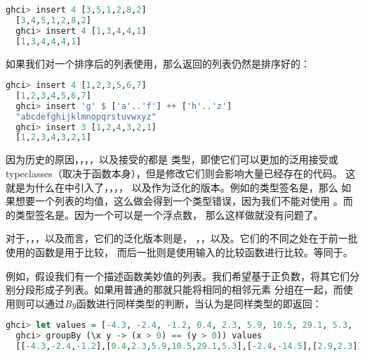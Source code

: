 \documentclass[./main.tex]{subfiles}
\begin{document}
\begin{lstlisting}[language=Haskell]
  ghci> insert 4 [3,5,1,2,8,2]
  [3,4,5,1,2,8,2]
  ghci> insert 4 [1,3,4,4,1]
  [1,3,4,4,4,1]
\end{lstlisting}

如果我们对一个排序后的列表使用，那么返回的列表仍然是排序好的：

\begin{lstlisting}[language=Haskell]
  ghci> insert 4 [1,2,3,5,6,7]
  [1,2,3,4,5,6,7]
  ghci> insert 'g' $ ['a'..'f'] ++ ['h'..'z']
  "abcdefghijklmnopqrstuvwxyz"
  ghci> insert 3 [1,2,4,3,2,1]
  [1,2,3,4,3,2,1]
\end{lstlisting}

因为历史的原因，，，，\acode{!!}以及接受的都是
类型，即使它们可以更加的泛用接受或 typeclasses（取决于函数本身），但是修改它们则会影响大量已经存在的代码。
这就是为什么在中引入了，，，，
以及作为泛化的版本。例如的类型签名是，那么
如果想要一个列表的均值，这么做会得到一个类型错误，因为我们不能对使用
\acode{/}。而的类型签名是。因为一个可以是一个浮点数，
那么这样做就没有问题了。

对于，，，以及而言，它们的泛化版本则是，
，，以及。它们的不同之处在于前一批使用的函数是\acode{==}用于比较，
而后一批则是使用输入的比较函数进行比较。等同于。

例如，假设我们有一个描述函数美妙值的列表。我们希望基于正负数，将其它们分别分段形成子列表。如果用普通的那就只能将相同的相邻元素
分组在一起，而使用则可以通过\textit{By}函数进行同样类型的判断，当认为是同样类型的即返回：

\begin{lstlisting}[language=Haskell]
  ghci> let values = [-4.3, -2.4, -1.2, 0.4, 2.3, 5.9, 10.5, 29.1, 5.3, -2.4, -14.5, 2.9, 2.3]
  ghci> groupBy (\x y -> (x > 0) == (y > 0)) values
  [[-4.3,-2.4,-1.2],[0.4,2.3,5.9,10.5,29.1,5.3],[-2.4,-14.5],[2.9,2.3]]
\end{lstlisting}
\end{document}
